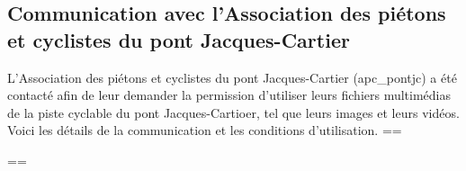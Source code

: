 ﻿\subsection{Communication avec l’Association des piétons et cyclistes du pont Jacques-Cartier}
\par L’Association des piétons et cyclistes du pont Jacques-Cartier (apc\_pontjc) a été contacté afin de leur demander la permission d'utiliser leurs fichiers multimédias de la piste cyclable du pont Jacques-Cartioer, tel que leurs images et leurs vidéos. Voici les détails de la communication et les conditions d'utilisation.
==
 \label{pdf:courriel_autorisation_apc_pontjc}
\par==